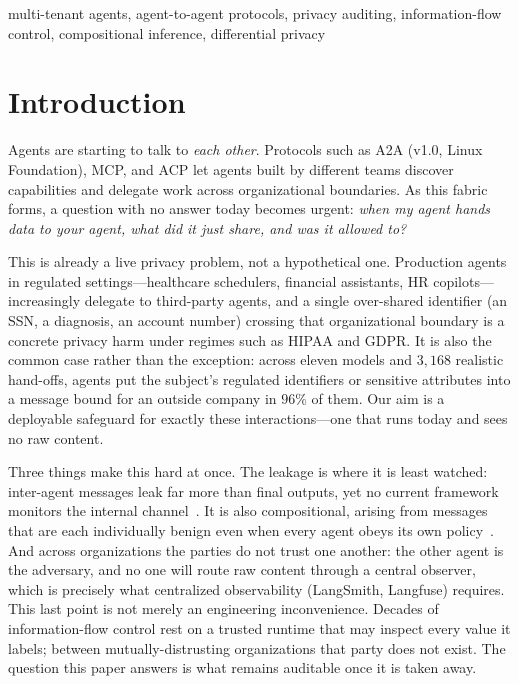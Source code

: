 \documentclass[conference,compsoc]{IEEEtran}
\begin{document}
\begin{IEEEkeywords}
multi-tenant agents, agent-to-agent protocols, privacy auditing, information-flow
control, compositional inference, differential privacy
\end{IEEEkeywords}

\section{Introduction}
Agents are starting to talk to \emph{each other}. Protocols such as A2A (v1.0,
Linux Foundation), MCP, and ACP let agents built by different teams discover
capabilities and delegate work across organizational boundaries. As this fabric
forms, a question with no answer today becomes urgent: \emph{when my agent hands
data to your agent, what did it just share, and was it allowed to?}

This is already a live privacy problem, not a hypothetical one. Production agents
in regulated settings---healthcare schedulers, financial assistants, HR
copilots---increasingly delegate to third-party agents, and a single over-shared
identifier (an SSN, a diagnosis, an account number) crossing that organizational
boundary is a concrete privacy harm under regimes such as HIPAA and GDPR. It is
also the common case rather than the exception: across eleven models and $3{,}168$ realistic hand-offs, agents put the subject's regulated identifiers or sensitive attributes into a message bound for an outside company in $96\%$ of them. Our aim is a
deployable safeguard for exactly these interactions---one that runs today and sees
no raw content.

Three things make this hard at once. The leakage is where it is least watched:
inter-agent messages leak far more than final outputs, yet no current framework
monitors the internal channel~\cite{agentleak}. It is also compositional, arising
from messages that are each individually benign even when every agent obeys its
own policy~\cite{sumleaks}. And across organizations the parties do not trust one
another: the other agent is the adversary, and no one will route raw content
through a central observer, which is precisely what centralized observability
(LangSmith, Langfuse) requires. This last point is not merely an engineering
inconvenience. Decades of information-flow control rest on a trusted runtime that
may inspect every value it labels; between mutually-distrusting organizations
that party does not exist. The question this paper answers is what remains
auditable once it is taken away.
\end{document}
